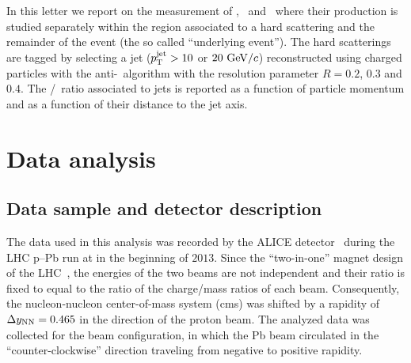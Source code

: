 In this letter we report on the measurement of \lda, \alda\ and \ks\ where their production is studied separately within the region associated to a hard scattering and the remainder of the event (the so called ``underlying event''). The hard scatterings are tagged by selecting a jet ($p_{\mathrm{T}}^{\mathrm{jet}} > 10$ or $20~\mathrm{GeV}/c$) reconstructed using charged particles with the anti-\kt\ algorithm with the resolution parameter $R=0.2$, $0.3$ and $0.4$. The \lda/\ks\ ratio associated to jets is reported as a function of particle momentum and as a function of their distance to the jet axis.


\section{Data analysis}

\subsection{Data sample and detector description}

The data used in this analysis was recorded by the ALICE detector~\cite{Aamodt:2008zz} during the LHC p--Pb run at  in the beginning of $2013$. Since the ``two-in-one'' magnet design of the LHC~\cite{Evans:2008zzb}, the energies of the two beams are not independent and their ratio is fixed to equal to the ratio of the charge/mass ratios of each beam. Consequently, the nucleon-nucleon center-of-mass system (cms) was shifted by a rapidity of $\Delta y_{\rm NN}=0.465$ in the direction of the proton beam. The analyzed data was collected for the beam configuration, in which the Pb beam circulated in the ``counter-clockwise'' direction traveling from negative to positive rapidity.

